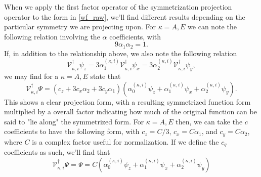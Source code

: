 When we apply the first factor operator of the symmetrization projection
operator to the form in \eqref{wf_raw}, we'll find different results depending
on the particular symmetry we are projecting upon. For $\kappa = A,E$ we can
note the following relation involving the $\alpha$ coefficients, with
\begin{equation}
9\alpha_{1}\alpha_{2} = 1.
\end{equation}
If, in addition to the relationship above, we also note the following relation
\begin{equation}
\mathcal{V}_{\kappa,i}^{\dagger}\psi_{z}
  =
3\alpha_{1}^{\left(\kappa,i\right)}\mathcal{V}_{\kappa,i}^{\dagger}\psi_{x}
  =
3\alpha_{2}^{\left(\kappa,i\right)}\mathcal{V}_{\kappa,i}^{\dagger}\psi_{y}
,
\end{equation}
we may find for a $\kappa = A,E$ state that
\begin{equation}
\mathcal{V}_{\kappa,i}^{\dagger}\Psi
  =
  \left(c_{z}+3c_{x}\alpha_{2}+3c_{y}\alpha_{1}\right)
  \left(
    \alpha_{0}^{\left(\kappa,i\right)}\psi_{z}
    +
    \alpha_{1}^{\left(\kappa,i\right)}\psi_{x}
    +
    \alpha_{2}^{\left(\kappa,i\right)}\psi_{y}
  \right)
  .
\end{equation}
This shows a clear projection form, with a resulting symmetrized function form
multiplied by a overall factor indicating how much of the original function can
be said to "lie along" the symmetrized form. For $\kappa = A,E$ then, we can
take the $c$ coefficients to have the following form, with $ c_{z} = C/3 $, $
c_{x} = C \alpha_{ 1 } $, and $c_{y} = C \alpha_{ 2 } $, where $C$ is a complex
factor useful for normalization. If we define the $c_{q}$ coefficients as such,
we'll find that
\begin{equation}
\mathcal{V}_{\kappa,i}^{\dagger}
\Psi
  =
\Psi
  =
C
\left(
  \alpha_{0}^{\left(\kappa,i\right)}\psi_{z}
  +
  \alpha_{1}^{\left(\kappa,i\right)}\psi_{x}
  +
  \alpha_{2}^{\left(\kappa,i\right)}\psi_{y}
\right)
\label{wf_symm:a}
\end{equation}

